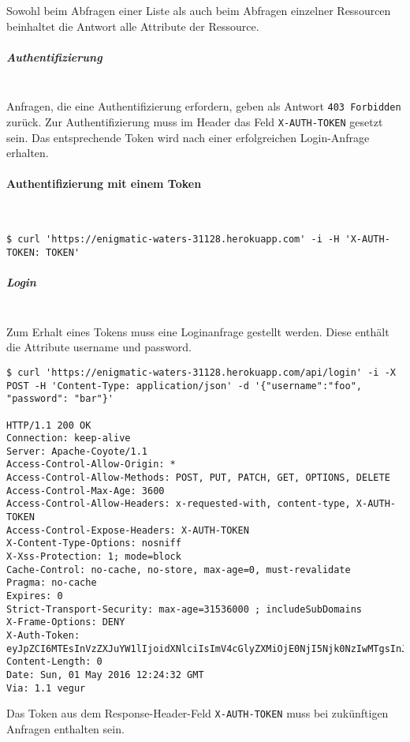 Sowohl beim Abfragen einer Liste als auch beim Abfragen einzelner Ressourcen beinhaltet die Antwort alle Attribute der Ressource.

\subparagraph{Authentifizierung}\mbox{}\\
Anfragen, die eine Authentifizierung erfordern, geben als Antwort \colorbox{pregray}{\lstinline{403 Forbidden}} zurück. Zur Authentifizierung muss im Header das Feld \colorbox{pregray}{\lstinline{X-AUTH-TOKEN}} gesetzt sein. Das entsprechende Token wird nach einer erfolgreichen Login-Anfrage erhalten.

\paragraph{Authentifizierung mit einem Token}\mbox{}\\
\begin{lstlisting}
$ curl 'https://enigmatic-waters-31128.herokuapp.com' -i -H 'X-AUTH-TOKEN: TOKEN'
\end{lstlisting}

\subparagraph{Login}\mbox{}\\
Zum Erhalt eines Tokens muss eine Loginanfrage gestellt werden. Diese enthält die Attribute username und password.
\vspace{2em}
\begin{lstlisting}
$ curl 'https://enigmatic-waters-31128.herokuapp.com/api/login' -i -X POST -H 'Content-Type: application/json' -d '{"username":"foo", "password": "bar"}'

HTTP/1.1 200 OK
Connection: keep-alive
Server: Apache-Coyote/1.1
Access-Control-Allow-Origin: *
Access-Control-Allow-Methods: POST, PUT, PATCH, GET, OPTIONS, DELETE
Access-Control-Max-Age: 3600
Access-Control-Allow-Headers: x-requested-with, content-type, X-AUTH-TOKEN
Access-Control-Expose-Headers: X-AUTH-TOKEN
X-Content-Type-Options: nosniff
X-Xss-Protection: 1; mode=block
Cache-Control: no-cache, no-store, max-age=0, must-revalidate
Pragma: no-cache
Expires: 0
Strict-Transport-Security: max-age=31536000 ; includeSubDomains
X-Frame-Options: DENY
X-Auth-Token: eyJpZCI6MTEsInVzZXJuYW1lIjoidXNlciIsImV4cGlyZXMiOjE0NjI5Njk0NzIwMTgsInJvbGVzIjpbIlVTRVIiXX0=.LDd74G0yJAuQChYR9P0AOmThfylOGGlY19u2DcTcXyQ=
Content-Length: 0
Date: Sun, 01 May 2016 12:24:32 GMT
Via: 1.1 vegur
\end{lstlisting}
\vspace{2em}
Das Token aus dem Response-Header-Feld \colorbox{pregray}{\lstinline{X-AUTH-TOKEN}} muss bei zukünftigen Anfragen enthalten sein.

